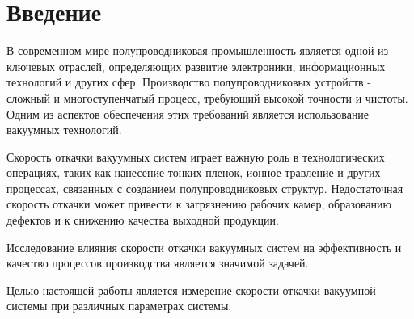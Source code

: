 \section{Введение}
В современном мире полупроводниковая промышленность является одной из ключевых отраслей, определяющих развитие электроники, информационных технологий и других сфер. Производство полупроводниковых устройств - сложный и многоступенчатый процесс, требующий высокой точности и чистоты. Одним из аспектов обеспечения этих требований является использование вакуумных технологий.

Скорость откачки вакуумных систем играет важную роль в технологических операциях, таких как нанесение тонких пленок, ионное травление и других процессах, связанных с созданием полупроводниковых структур. Недостаточная скорость откачки может привести к загрязнению рабочих камер, образованию дефектов и к снижению качества выходной продукции.

Исследование влияния скорости откачки вакуумных систем на эффективность и качество процессов производства является значимой задачей.

Целью настоящей работы является измерение скорости откачки вакуумной системы при различных параметрах системы.